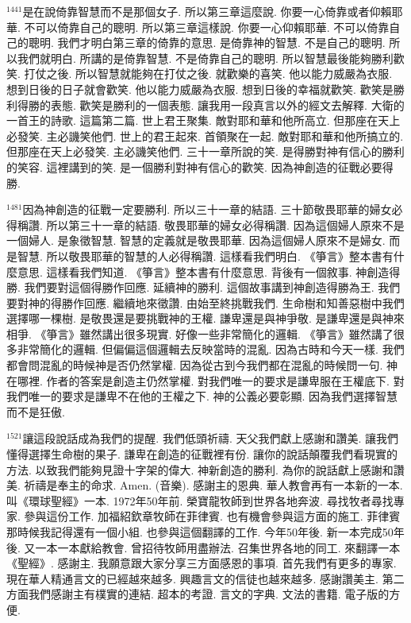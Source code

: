 \documentclass{book}
\begin{document}
$^{1441}$是在說倚靠智慧而不是那個女子.
所以第三章這麼說.
你要一心倚靠或者仰賴耶華.
不可以倚靠自己的聰明.
所以第三章這樣說.
你要一心仰賴耶華.
不可以倚靠自己的聰明.
我們才明白第三章的倚靠的意思.
是倚靠神的智慧.
不是自己的聰明.
所以我們就明白.
所講的是倚靠智慧.
不是倚靠自己的聰明.
所以智慧最後能夠勝利歡笑.
打仗之後.
所以智慧就能夠在打仗之後.
就歡樂的喜笑.
他以能力威嚴為衣服.
想到日後的日子就會歡笑.
他以能力威嚴為衣服.
想到日後的幸福就歡笑.
歡笑是勝利得勝的表態.
歡笑是勝利的一個表態.
讓我用一段真言以外的經文去解釋.
大衛的一首王的詩歌.
這篇第二篇.
世上君王聚集.
敵對耶和華和他所高立.
但那座在天上必發笑.
主必譏笑他們.
世上的君王起來.
首領聚在一起.
敵對耶和華和他所搞立的.
但那座在天上必發笑.
主必譏笑他們.
三十一章所說的笑.
是得勝對神有信心的勝利的笑容.
這裡講到的笑.
是一個勝利對神有信心的歡笑.
因為神創造的征戰必要得勝.

$^{1481}$因為神創造的征戰一定要勝利.
所以三十一章的結語.
三十節敬畏耶華的婦女必得稱讚.
所以第三十一章的結語.
敬畏耶華的婦女必得稱讚.
因為這個婦人原來不是一個婦人.
是象徵智慧.
智慧的定義就是敬畏耶華.
因為這個婦人原來不是婦女.
而是智慧.
所以敬畏耶華的智慧的人必得稱讚.
這樣看我們明白.
《箏言》整本書有什麼意思.
這樣看我們知道.
《箏言》整本書有什麼意思.
背後有一個敘事.
神創造得勝.
我們要對這個得勝作回應.
延續神的勝利.
這個故事講到神創造得勝為王.
我們要對神的得勝作回應.
繼續地來徵讚.
由始至終挑戰我們.
生命樹和知善惡樹中我們選擇哪一棵樹.
是敬畏還是要挑戰神的王權.
謙卑還是與神爭敬.
是謙卑還是與神來相爭.
《箏言》雖然講出很多現實.
好像一些非常簡化的邏輯.
《箏言》雖然講了很多非常簡化的邏輯.
但偏偏這個邏輯去反映當時的混亂.
因為古時和今天一樣.
我們都會問混亂的時候神是否仍然掌權.
因為從古到今我們都在混亂的時候問一句.
神在哪裡.
作者的答案是創造主仍然掌權.
對我們唯一的要求是謙卑服在王權底下.
對我們唯一的要求是謙卑不在他的王權之下.
神的公義必要彰顯.
因為我們選擇智慧而不是狂傲.

$^{1521}$讓這段說話成為我們的提醒.
我們低頭祈禱.
天父我們獻上感謝和讚美.
讓我們懂得選擇生命樹的果子.
謙卑在創造的征戰裡有份.
讓你的說話顛覆我們看現實的方法.
以致我們能夠見證十字架的偉大.
神新創造的勝利.
為你的說話獻上感謝和讚美.
祈禱是奉主的命求.
Amen.
(音樂).
感謝主的恩典.
華人教會再有一本新的一本.
叫《環球聖經》一本.
1972年50年前.
榮寶龍牧師到世界各地奔波.
尋找牧者尋找專家.
參與這份工作.
加福紹欽章牧師在菲律賓.
也有機會參與這方面的施工.
菲律賓那時候我記得還有一個小組.
也參與這個翻譯的工作.
今年50年後.
新一本完成50年後.
又一本一本獻給教會.
曾招待牧師用盡辦法.
召集世界各地的同工.
來翻譯一本《聖經》.
感謝主.
我願意跟大家分享三方面感恩的事項.
首先我們有更多的專家.
現在華人精通言文的已經越來越多.
興趣言文的信徒也越來越多.
感謝讚美主.
第二方面我們感謝主有樸實的連結.
超本的考證.
言文的字典.
文法的書籍.
電子版的方便.
\end{document}
